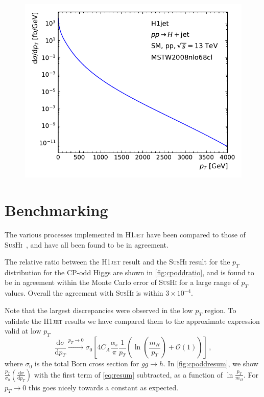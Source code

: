 \documentclass[12pt]{article}
\begin{document}
\begin{figure}[tbh] 
  \centering
  \includegraphics[width=0.6\linewidth]{figures/h1jetresult}
  \label{fig:h1jetresult}
\end{figure}

\section{Benchmarking}
\label{sec:benchmarking}
The various processes implemented in \textsc{H1jet} have been compared to those of \textsc{SusHi}~\cite{Harlander:2012pb,Harlander:2016hcx}, and have all been found to be in agreement. 

The relative ratio between the \textsc{H1jet} result and the
\textsc{SusHi} result for the $p_T$ distribution for the CP-odd Higgs
are shown in \autoref{fig:cpoddratio}, and is found to be in agreement
within the Monte Carlo error of \textsc{SusHi} for a large range of
$p_T$ values. Overall the agreement with \textsc{SusHi} is within
$3 \times 10^{-4}$.

Note that the largest discrepancies were observed in the low $p_T$
region. To validate the \textsc{H1jet} results we have compared them
to the approximate expression valid at low $p_T$
\begin{equation}
	\frac{\mathrm{d} \sigma}{\mathrm{d} p_T} \xrightarrow{p_T \rightarrow 0} \sigma_0 \left [ 4 C_A \frac{\alpha_s}{\pi} \frac{1}{p_T} \left(\ln\left ( \frac{m_H}{p_T} \right ) + \mathcal{O} (1)\right) \right ] \,, \label{eq:resum}
\end{equation}
where $\sigma_0$ is the total Born cross section for $gg \rightarrow h$. In \autoref{fig:cpoddresum}, we show $\frac{p_T}{\sigma_0} \left ( \frac{\mathrm{d} \sigma}{\mathrm{d} p_T} \right )$ with the first term of \autoref{eq:resum} subtracted, as a function of $\ln \frac{p_T}{m_H}$. For $p_T \rightarrow 0$ this goes nicely towards a constant as expected. 
\end{document}
